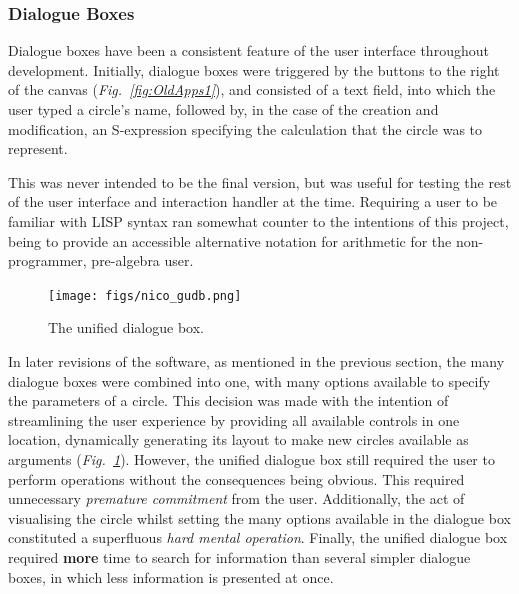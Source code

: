 \documentclass[12pt,twoside,notitlepage,xetex]{report}
\begin{document}
{\subsubsection{Dialogue Boxes}

Dialogue boxes have been a consistent feature of the user interface throughout development.  Initially, dialogue boxes were triggered by the buttons to the right of the canvas (\emph{Fig.~\ref{fig:OldApps1}}), and consisted of a text field, into which the user typed a circle's name, followed by, in the case of the creation and modification, an S-expression specifying the calculation that the circle was to represent.

This was never intended to be the final version, but was useful for testing the rest of the user interface and interaction handler at the time.  Requiring a user to be familiar with LISP syntax ran somewhat counter to the intentions of this project, being to provide an accessible alternative notation for arithmetic for the non-programmer, pre-algebra user.

\begin{center}
\begin{figure}[H]
\begin{center}
\texttt{[image: figs/nico\_gudb.png]}
\end{center}
\caption{The unified dialogue box.}
\label{fig:GUDB}
\end{figure}
\end{center}

In later revisions of the software, as mentioned in the previous section, the many dialogue boxes were combined into one, with many options available to specify the parameters of a circle.  This decision was made with the intention of streamlining the user experience by providing all available controls in one location, dynamically generating its layout to make new circles available as arguments (\emph{Fig.~\ref{fig:GUDB}}).  However, the unified dialogue box still required the user to perform operations without the consequences being obvious.  This required unnecessary \emph{premature commitment} from the user.  Additionally, the act of visualising the circle whilst setting the many options available in the dialogue box constituted a superfluous \emph{hard mental operation}.  Finally, the unified dialogue box required {\bf more} time to search for information than several simpler dialogue boxes, in which less information is presented at once.

}
\end{document}
